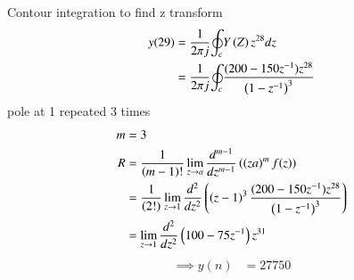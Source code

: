 \documentclass[journal,12pt,twocolumn]{IEEEtran}
\theoremstyle{remark}
\begin{document}
Contour integration to find z transform
\begin{align}
y(29)&=\frac{1}{2{\pi}j}{\oint_c}Y\left(Z\right)z^{28}dz\\
&=\frac{1}{2{\pi}j}{\oint_c}{\frac{(200-150z^{-1})z^{28}}{\left(1-z^{-1}\right)^{3}}}\\
\end{align}
pole at 1 repeated 3 times
\begin{align}
m&=3\\
R&=\frac{1}{\left(m-1\right)!}\lim_{z\to a}\frac{d^{m-1}}{dz^{m-1}}\left(\left(z
a\right)^mf{\left(z\right)}\right)\\
&=\frac{1}{\left(2!\right)}\lim_{z\to 1}\frac{d^2}{dz^2}\left(\left(z-1\right)^{3}\frac{(200-150z^{-1})z^{28}}{\left(1-z^{-1}\right)^3}\right)\\
&=\lim_{z\to1}\frac{d^2}{dz^2}\left(100-75z^{-1}\right)z^{31}
\end{align}
\begin{align}
\implies y(n)&=27750
\end{align}
\end{document}
